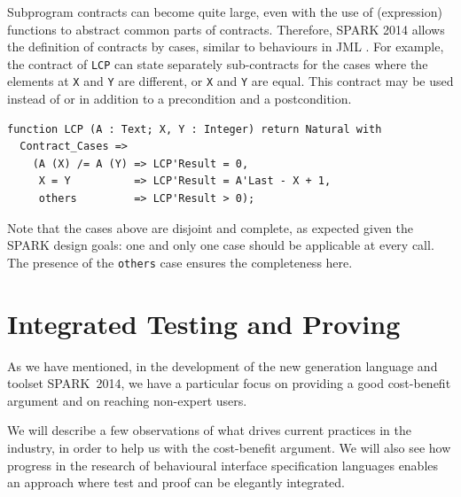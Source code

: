 \documentclass[sttt,final]{svjour}
\newcommand{\newspark}{SPARK~2014\xspace}
\begin{document}
Subprogram contracts can become quite large, even with the use of (expression)
functions to abstract common parts of contracts. Therefore, SPARK 2014 allows
the definition of contracts by cases, similar to behaviours in
JML \cite{JML}. For example, the contract of \verb|LCP| can state separately
sub-contracts for the cases where the elements at \verb|X| and \verb|Y| are
different, or \verb|X| and \verb|Y| are equal. This contract may be used
instead of or in addition to a precondition and a postcondition.

\begin{lstlisting}
function LCP (A : Text; X, Y : Integer) return Natural with
  Contract_Cases =>
    (A (X) /= A (Y) => LCP'Result = 0,
     X = Y          => LCP'Result = A'Last - X + 1,
     others         => LCP'Result > 0);
\end{lstlisting}

Note that the cases above are disjoint and complete, as expected given
the SPARK design goals: one and only one case should be applicable at
every call. The presence of the \verb|others| case ensures the
completeness here.

\section{Integrated Testing and Proving}
\label{hilite}
As we have mentioned, in the development of the new generation
language and toolset \newspark, we have a particular focus on
providing a good cost-benefit argument and on reaching non-expert
users.

We will describe a few observations of what drives current practices
in the industry, in order to help us with the cost-benefit
argument. We will also see how progress in the research of behavioural
interface specification languages \cite{HatcliffLLMP12} enables an
approach where test and proof can be elegantly integrated.
\end{document}
